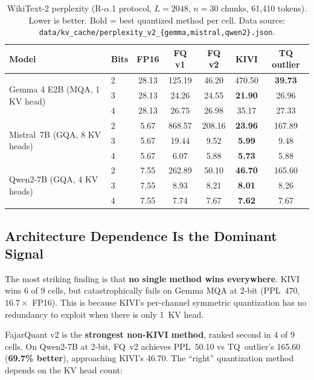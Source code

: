\documentclass{article}
\begin{document}
\begin{table}[t]
\centering
\small
\caption{WikiText-2 perplexity (R-$\alpha$.1 protocol, $L{=}2048$,
$n{=}30$ chunks, 61,410 tokens). Lower is better. Bold = best
quantized method per cell. Data source:
\texttt{data/kv\_cache/perplexity\_v2\_\{gemma,mistral,qwen2\}.json}.}
\label{tab:ppl_crossmodel}
\begin{tabular}{ll|ccccc}
\toprule
Model & Bits & FP16 & FQ v1 & \textbf{FQ v2} & KIVI & TQ outlier \\
\midrule
\multirow{3}{*}{Gemma 4 E2B (MQA, 1 KV head)}
 & 2 & 28.13 & 125.19 & 46.20 & 470.50 & \textbf{39.73} \\
 & 3 & 28.13 & 24.26 & 24.55 & \textbf{21.90} & 26.96 \\
 & 4 & 28.13 & 26.75 & 26.98 & 35.17 & 27.33 \\
\midrule
\multirow{3}{*}{Mistral~7B (GQA, 8 KV heads)}
 & 2 & 5.67 & 868.57 & 208.16 & \textbf{23.96} & 167.89 \\
 & 3 & 5.67 & 19.44 & 9.52 & \textbf{5.99} & 9.48 \\
 & 4 & 5.67 & 6.07 & 5.88 & \textbf{5.73} & 5.88 \\
\midrule
\multirow{3}{*}{Qwen2-7B (GQA, 4 KV heads)}
 & 2 & 7.55 & 262.89 & 50.10 & \textbf{46.70} & 165.60 \\
 & 3 & 7.55 & 8.93 & 8.21 & \textbf{8.01} & 8.26 \\
 & 4 & 7.55 & 7.74 & 7.67 & \textbf{7.62} & 7.67 \\
\bottomrule
\end{tabular}
\end{table}

\subsection{Architecture Dependence Is the Dominant Signal}

The most striking finding is that \textbf{no single method wins
everywhere}. KIVI wins 6 of 9 cells, but catastrophically fails on
Gemma MQA at 2-bit (PPL~470, $16.7\times$ FP16). This is because
KIVI's per-channel symmetric quantization has no redundancy to exploit
when there is only 1~KV head.

FajarQuant v2 is the \textbf{strongest non-KIVI method}, ranked second
in 4 of 9 cells. On Qwen2-7B at 2-bit, FQ~v2 achieves PPL~50.10 vs
TQ~outlier's 165.60 (\textbf{69.7\% better}), approaching KIVI's
46.70. The ``right'' quantization method depends on the KV head count:
\end{document}
